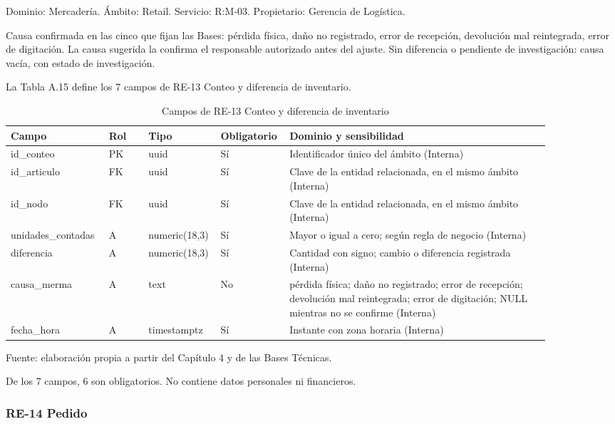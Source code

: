 \documentclass[11pt]{article}
\begin{document}
Dominio: Mercadería. Ámbito: Retail. Servicio: R:M-03. Propietario: Gerencia de Logística.

Causa confirmada en las cinco que fijan las Bases: pérdida física, daño no registrado, error de recepción, devolución mal reintegrada, error de digitación. La causa sugerida la confirma el responsable autorizado antes del ajuste. Sin diferencia o pendiente de investigación: causa vacía, con estado de investigación.

La Tabla A.15 define los 7 campos de RE-13 Conteo y diferencia de inventario.

\begin{table}[htbp]
\caption{Campos de RE-13 Conteo y diferencia de inventario}\label{tab:d_re13}
\centering
\begin{tabular}{@{}p{0.167\linewidth}p{0.070\linewidth}p{0.079\linewidth}p{0.097\linewidth}p{0.465\linewidth}@{}}
\toprule Campo & Rol & Tipo & Obligatorio & Dominio y sensibilidad \\
\midrule
id\_conteo & PK & uuid & Sí & Identificador único del ámbito (Interna) \\
id\_articulo & FK & uuid & Sí & Clave de la entidad relacionada, en el mismo ámbito (Interna) \\
id\_nodo & FK & uuid & Sí & Clave de la entidad relacionada, en el mismo ámbito (Interna) \\
unidades\_contadas & A & numeric(18,3) & Sí & Mayor o igual a cero; según regla de negocio (Interna) \\
diferencia & A & numeric(18,3) & Sí & Cantidad con signo; cambio o diferencia registrada (Interna) \\
causa\_merma & A & text & No & pérdida física; daño no registrado; error de recepción; devolución mal reintegrada; error de digitación; NULL mientras no se confirme (Interna) \\
fecha\_hora & A & timestamptz & Sí & Instante con zona horaria (Interna) \\
\bottomrule
\end{tabular}
\par\smallskip
{\raggedright Fuente: elaboración propia a partir del Capítulo 4 y de las Bases Técnicas.\par}
\end{table}


De los 7 campos, 6 son obligatorios. No contiene datos personales ni financieros.

\subsubsection{RE-14 Pedido}
\end{document}
